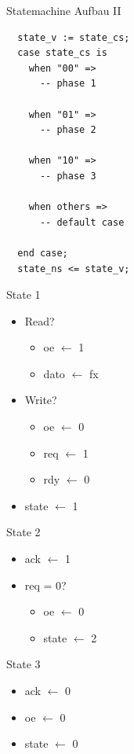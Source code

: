   \begin{frame} [fragile] {Statemachine Aufbau II}
    \vspace{-.7cm}
    \begin{lstlisting}
  state_v := state_cs;
  case state_cs is
    when "00" =>
      -- phase 1

    when "01" =>
      -- phase 2

    when "10" =>
      -- phase 3

    when others =>
      -- default case
      
  end case;
  state_ns <= state_v;
    \end{lstlisting}
  \end{frame}


  \begin{frame} {State 1}
    \begin{itemize}
      \item Read?
      \begin{itemize}
        \item oe $\leftarrow$ 1
        \item dato $\leftarrow$ fx
      \end{itemize}
      \item Write?
      \begin{itemize}
        \item oe $\leftarrow$ 0
        \item req $\leftarrow$ 1
        \item rdy $\leftarrow$ 0
      \end{itemize}
      \item state $\leftarrow$ 1
    \end{itemize}
  \end{frame}


  \begin{frame} {State 2}
    \begin{itemize}
      \item ack $\leftarrow$ 1
      \item req = 0?
      \begin{itemize}
        \item oe $\leftarrow$ 0
        \item state $\leftarrow$ 2
      \end{itemize}
    \end{itemize}
  \end{frame}


  \begin{frame} {State 3}
    \begin{itemize}
      \item ack $\leftarrow$ 0
      \item oe $\leftarrow$ 0
      \item state $\leftarrow$ 0
    \end{itemize}
  \end{frame}


